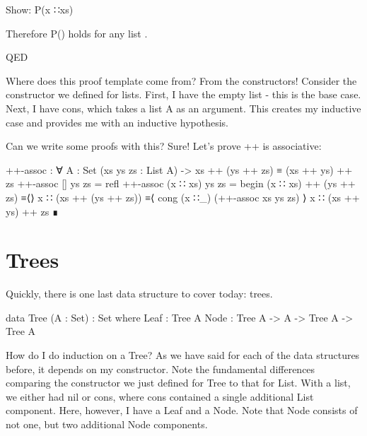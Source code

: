 \documentclass{lecturenotes}
\newcommand{\agdacons}{\textsf{∷}\xspace}
\begin{document}
\noindent Show: P(\textsf{x} \agdacons \textsf{xs}) 

\vspace{0.1in}

\noindent Therefore P() holds for any list .

\noindent QED

\vspace{0.2in}

Where does this proof template come from? From the constructors!
Consider the constructor we defined for lists. 
First, I have the empty list - this is the base case. 
Next, I have cons, which takes a list A as an argument. 
This creates my inductive case and provides me with an inductive hypothesis. 

\vspace{0.2in}

\noindent Can we write some proofs with this?
Sure! Let's prove \textsf{++} is associative:

\begin{center}
    \begin{code}
        ++-assoc : ∀ {A : Set} (xs ys zs : List A) -> xs ++ (ys ++ zs) ≡ (xs ++ ys) ++ zs
        ++-assoc [] ys zs = refl
        ++-assoc (x ∷ xs) ys zs =
            begin 
                (x ∷ xs) ++ (ys ++ zs)
            ≡⟨⟩
                x ∷ (xs ++ (ys ++ zs))
            ≡⟨ cong (x ∷_) (++-assoc xs ys zs) ⟩
                x ∷ (xs ++ ys) ++ zs
            ∎
    \end{code}
\end{center}

\vspace{0.2in}

\section{Trees}
\label{sec:tree-types}

Quickly, there is one last data structure to cover today: trees.

\begin{center}
    \begin{code}
        data Tree (A : Set) : Set where
            Leaf : Tree A 
            Node : Tree A -> A -> Tree A -> Tree A
    \end{code}
\end{center}

\pagebreak

How do I do induction on a Tree? 
As we have said for each of the data structures before, it depends on my constructor. 
Note the fundamental differences comparing the constructor we just defined for Tree to that for List. 
With a list, we either had nil or cons, where cons contained a single additional List component.
Here, however, I have a Leaf and a Node.
Note that Node consists of not one, but two additional Node components.
\end{document}
